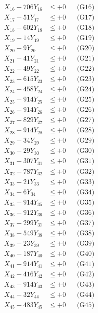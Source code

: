 \documentclass[a4paper,10pt]{article}
\begin{document}
{\begin{align}
X_{16} - 706Y_{16} &\leq +0 && \text{(G16)} \\
X_{17} - 51Y_{17} &\leq +0 && \text{(G17)} \\
X_{18} - 602Y_{18} &\leq +0 && \text{(G18)} \\
X_{19} - 14Y_{19} &\leq +0 && \text{(G19)} \\
X_{20} - 9Y_{20} &\leq +0 && \text{(G20)} \\
\allowbreak
X_{21} - 41Y_{21} &\leq +0 && \text{(G21)} \\
X_{22} - 49Y_{22} &\leq +0 && \text{(G22)} \\
X_{23} - 615Y_{23} &\leq +0 && \text{(G23)} \\
X_{24} - 458Y_{24} &\leq +0 && \text{(G24)} \\
X_{25} - 914Y_{25} &\leq +0 && \text{(G25)} \\
X_{26} - 914Y_{26} &\leq +0 && \text{(G26)} \\
X_{27} - 829Y_{27} &\leq +0 && \text{(G27)} \\
X_{28} - 914Y_{28} &\leq +0 && \text{(G28)} \\
X_{29} - 34Y_{29} &\leq +0 && \text{(G29)} \\
X_{30} - 29Y_{30} &\leq +0 && \text{(G30)} \\
\allowbreak
X_{31} - 307Y_{31} &\leq +0 && \text{(G31)} \\
X_{32} - 787Y_{32} &\leq +0 && \text{(G32)} \\
X_{33} - 21Y_{33} &\leq +0 && \text{(G33)} \\
X_{34} - 6Y_{34} &\leq +0 && \text{(G34)} \\
X_{35} - 914Y_{35} &\leq +0 && \text{(G35)} \\
X_{36} - 912Y_{36} &\leq +0 && \text{(G36)} \\
X_{37} - 299Y_{37} &\leq +0 && \text{(G37)} \\
X_{38} - 549Y_{38} &\leq +0 && \text{(G38)} \\
X_{39} - 23Y_{39} &\leq +0 && \text{(G39)} \\
X_{40} - 187Y_{40} &\leq +0 && \text{(G40)} \\
\allowbreak
X_{41} - 914Y_{41} &\leq +0 && \text{(G41)} \\
X_{42} - 416Y_{42} &\leq +0 && \text{(G42)} \\
X_{43} - 914Y_{43} &\leq +0 && \text{(G43)} \\
X_{44} - 32Y_{44} &\leq +0 && \text{(G44)} \\
X_{45} - 483Y_{45} &\leq +0 && \text{(G45)} \\

\end{align}}
\end{document}
